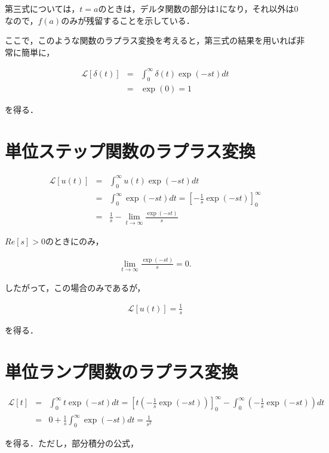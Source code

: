 \documentclass[a4paper, 12pt]{jsarticle}
\begin{document}
第三式については，$t=a$のときは，デルタ関数の部分は1になり，それ以外は0なので，$f(a)$のみが残留することを示している．

\par

ここで，このような関数のラプラス変換を考えると，第三式の結果を用いれば非常に簡単に，

\begin{eqnarray}
\mathcal{L} [\delta(t)] &=& \int_0^\infty \delta(t) \exp(-st)dt \\ \nonumber
&=& \exp(0) = 1
\end{eqnarray}

を得る． 

\section{単位ステップ関数のラプラス変換}
\begin{eqnarray}
\mathcal{L} [u(t)] &=& \int_0^\infty u(t) \exp(-st) dt  \\ \nonumber
&=& \int_0^\infty \exp(-st)dt = \left[-\frac1s \exp(-st)\right]_0^\infty \\ \nonumber
&=& \frac1s - \lim_{t\rightarrow \infty} \frac{\exp(-st)}{s}
\end{eqnarray}

$Re[s] > 0$のときにのみ，

\begin{eqnarray}
\lim_{t\rightarrow \infty} \frac{\exp(-st)}{s} = 0.
\end{eqnarray}

したがって，この場合のみであるが，

\begin{eqnarray}
\mathcal{L} [u(t)] = \frac1s
\end{eqnarray}

を得る．

\section{単位ランプ関数のラプラス変換}
\begin{eqnarray}
\mathcal{L}[t] &=& \int_0^\infty t \exp(-st)dt = \left[t(-\frac1s \exp(-st))\right]_0^\infty - \int_0^\infty \left(- \frac1s \exp(-st)\right) dt \\ \nonumber
&=& 0 + \frac1s \int_0^\infty \exp(-st) dt = \frac1{s^2}
\end{eqnarray}

を得る．ただし，部分積分の公式，
\end{document}
